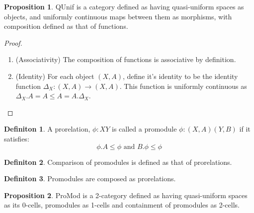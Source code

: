 \documentclass[18pt,a4paper]{article}
\makeatletter
\theoremstyle{definition}
\newtheorem{definition}{Definiton}[section]
\newtheorem{proop}{Proposition}[section]
\newcommand{\carrow}{}%
\DeclareRobustCommand{\carrow}{%
	\mathrel{\vphantom{\rightarrow}\mathpalette\circle@arrow\relax}%
}
\newcommand{\circle@arrow}[2]{%
	\m@th
	\ooalign{%
		\hidewidth$#1\circ\mkern1mu$\hidewidth\cr
	$#1\longrightarrow$\cr}%
}
\makeatother
\begin{document}
\begin{proop} QUnif is a category defined as having quasi-uniform spaces as objects,
	and uniformly continuous maps between them as morphisms, with composition defined as that of functions.
\end{proop}
\begin{proof}
	\begin{enumerate}[label=(\roman*)]
		\item (Associativity) The composition of functions is associative by definition.
		\item (Identity) For each object $(X,A)$, define it's identity to be the identity
			function $\Delta_X:(X,A) \to (X,A)$.
			This function is uniformly continuous as $\Delta_X.A=A \leq A=A.\Delta_X$.
	\end{enumerate}
\end{proof}
\begin{definition}%
	A prorelation, $\phi:X \carrow Y$ is called a promodule $\phi: (X,A) \carrow (Y,B)$  if it
	satisfies:
	\[ \phi.A \leq \phi \text{ and } B. \phi \leq \phi \]
\end{definition}
\begin{definition} %
	Comparison of promodules is defined as that of prorelations.
\end{definition}
\begin{definition} %
	Promodules are composed as prorelations.\\
\end{definition}
\begin{proop}%
	ProMod is a 2-category defined as having quasi-uniform spaces as its 0-cells,
	promodules as 1-cells and containment of promodules as 2-cells.
\end{proop}
\end{document}
